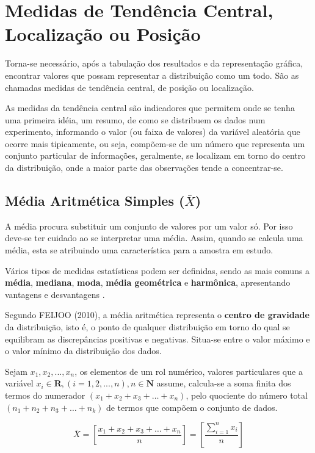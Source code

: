 \newpage
\section{Medidas de Tendência Central, Localização ou Posição}

Torna-se necessário, após a tabulação dos resultados e da representação gráfica, encontrar valores que possam representar a distribuição como um todo. São as chamadas medidas de tendência central, de posição ou localização.\vskip0.3cm

As medidas da tendência central são indicadores que permitem onde se tenha uma primeira idéia, um resumo, de como se distribuem os dados num experimento, informando o valor (ou faixa de valores) da variável aleatória que ocorre mais tipicamente, ou seja, compõem-se de um número que representa um conjunto particular de informações, geralmente, se localizam em torno do centro da distribuição, onde a maior parte das observações tende a concentrar-se.


\subsection{Média Aritmética Simples ($\bar{X}$)}

A média procura substituir um conjunto de valores por um valor só. Por isso
deve-se ter cuidado ao se interpretar uma média. Assim, quando se calcula uma média, esta se atribuindo
uma característica para a amostra em estudo.\vskip0.3cm

Vários tipos de medidas estatísticas podem ser definidas, sendo as mais comuns a \textbf{média}, \textbf{mediana}, \textbf{moda}, \textbf{média geométrica} e \textbf{harmônica}, apresentando vantagens e desvantagens
.\vskip0.3cm

Segundo FEIJOO (2010), a média aritmética representa o \textbf{centro de gravidade} da
distribuição, isto é, o ponto de qualquer distribuição em torno do qual se
equilibram as discrepâncias positivas e negativas. Situa-se entre o valor máximo e o valor mínimo da distribuição dos dados.\vskip0.3cm


Sejam $x_{1}, x_{2}, ..., x_{n}$, os elementos de um rol numérico, valores particulares que a variável $x_{i} \in \mathbf{R}, (i=1,2,...,n), n \in \mathbf{N} $ assume, calcula-se a soma finita dos termos do numerador $(x_{1}+x_{2}+x_{3}+\ldots+x_{n})$,  pelo quociente do número total $(n_{1}+n_{2}+n_{3}+\ldots+n_{k})$ de termos que compõem o conjunto de dados.\vskip0.3cm


\begin{equation}\label{media1}
\bar{X}= \left[ \frac{x_{1}+x_{2}+x_{3}+\ldots+x_{n}}{n} \right ] = \left[ \frac{\sum_{i=1}^{n}x_{i}}{n} \right ]
\end{equation}


